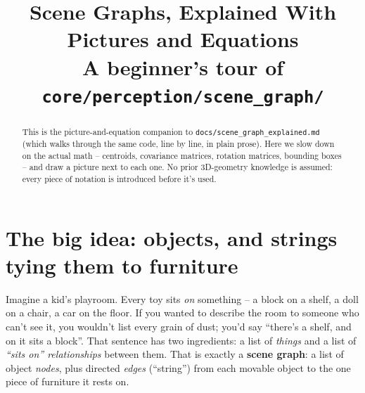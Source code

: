 \documentclass[11pt]{article}
\title{\textbf{Scene Graphs, Explained With Pictures and Equations}\\
\large A beginner's tour of \texttt{core/perception/scene\_graph/}}
\author{}
\date{}
\begin{document}
\maketitle

\begin{abstract}
\noindent
This is the picture-and-equation companion to
\texttt{docs/scene\_graph\_explained.md} (which walks through the same code,
line by line, in plain prose). Here we slow down on the actual math --
centroids, covariance matrices, rotation matrices, bounding boxes -- and draw
a picture next to each one. No prior 3D-geometry knowledge is assumed: every
piece of notation is introduced before it's used.
\end{abstract}

\tableofcontents
\bigskip

\section{The big idea: objects, and strings tying them to furniture}

Imagine a kid's playroom. Every toy sits \emph{on} something -- a block on a
shelf, a doll on a chair, a car on the floor. If you wanted to describe the
room to someone who can't see it, you wouldn't list every grain of dust;
you'd say ``there's a shelf, and on it sits a block''. That sentence has two
ingredients: a list of \emph{things} and a list of \emph{``sits on''
relationships} between them. That is exactly a \textbf{scene graph}: a list
of object \emph{nodes}, plus directed \emph{edges} (``string'') from each
movable object to the one piece of furniture it rests on.

\bigskip
\begin{center}
\end{center}
\end{document}
